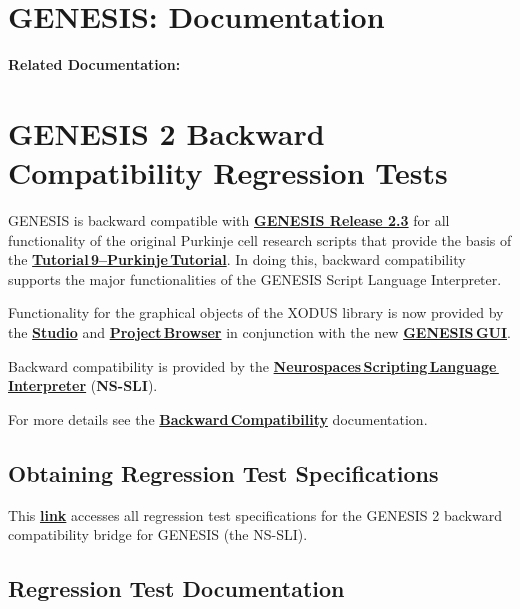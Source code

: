 \documentclass[12pt]{article}
\begin{document}
\section*{GENESIS: Documentation}

{\bf Related Documentation:}

\section*{GENESIS 2 Backward Compatibility Regression Tests}

GENESIS is backward compatible with \href{http://genesis-sim.org/GENESIS/genesis-ftp/}{\bf GENESIS Release 2.3} for all functionality of the original Purkinje cell research scripts that provide the basis of the \href{http://genesis-sim.org/GENESIS/illtuts/purkinje.html}{\bf Tutorial\,9--Purkinje\,Tutorial}. In doing this, backward compatibility supports the major functionalities of the GENESIS Script Language Interpreter.

Functionality for the graphical objects of the XODUS library is now provided by the \href{../studio/studio.tex}{\bf Studio} and \href{../project-browser/project-browser.tex}{\bf Project\,Browser} in conjunction with the new \href{../gtube/gtube.tex}{\bf GENESIS\,GUI}.

Backward compatibility is provided by the \href{../ns-sli/ns-sli.tex}{\bf Neurospaces\,Scripting\,Language\,Interpreter} ({\bf NS-SLI}).

For more details see the \href{../backward-compatibility/backward-compatibility.tex}{\bf Backward\,Compatibility} documentation.

\subsection*{Obtaining Regression Test Specifications}

This \href{http://www.neurospaces.org/neurospaces_project/ns-sli/tests/html/index.html}{\bf link} accesses all regression test specifications for the GENESIS 2 backward compatibility bridge for GENESIS (the NS-SLI).

\subsection*{Regression Test Documentation}
\end{document}
